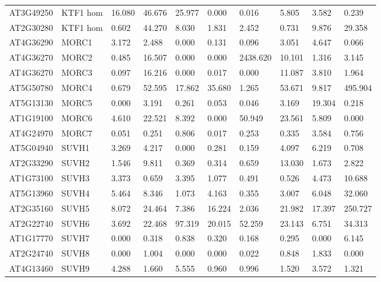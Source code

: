 \begin{landscape}
\begin{longtable}{l|l|lll|ll|lll}
AT3G49250 & KTF1 hom & 16.080 & 46.676  & 25.977   & 0.000  & 0.016    & 5.805   & 3.582  & 0.239    \\
AT2G30280 & KTF1 hom & 0.602  & 44.270  & 8.030    & 1.831  & 2.452    & 0.731   & 9.876  & 29.358   \\ \hline
AT4G36290 & MORC1    & 3.172  & 2.488   & 0.000    & 0.131  & 0.096    & 3.051   & 4.647  & 0.066    \\
AT4G36270 & MORC2    & 0.485  & 16.507  & 0.000    & 0.000  & 2438.620 & 10.101  & 1.316  & 3.145    \\
AT4G36270 & MORC3    & 0.097  & 16.216  & 0.000    & 0.017  & 0.000    & 11.087  & 3.810  & 1.964    \\
AT5G50780 & MORC4    & 0.679  & 52.595  & 17.862   & 35.680 & 1.265    & 53.671  & 9.817  & 495.904  \\
AT5G13130 & MORC5    & 0.000  & 3.191   & 0.261    & 0.053  & 0.046    & 3.169   & 19.304 & 0.218    \\
AT1G19100 & MORC6    & 4.610  & 22.521  & 8.392    & 0.000  & 50.949   & 23.561  & 5.809  & 0.000    \\
AT4G24970 & MORC7    & 0.051  & 0.251   & 0.806    & 0.017  & 0.253    & 0.335   & 3.584  & 0.756    \\ \hline
AT5G04940 & SUVH1    & 3.269  & 4.217   & 0.000    & 0.281  & 0.159    & 4.097   & 6.219  & 0.708    \\
AT2G33290 & SUVH2    & 1.546  & 9.811   & 0.369    & 0.314  & 0.659    & 13.030  & 1.673  & 2.822    \\
AT1G73100 & SUVH3    & 3.373  & 0.659   & 3.395    & 1.077  & 0.491    & 0.526   & 4.473  & 10.688   \\
AT5G13960 & SUVH4    & 5.464  & 8.346   & 1.073    & 4.163  & 0.355    & 3.007   & 6.048  & 32.060   \\
AT2G35160 & SUVH5    & 8.072  & 24.464  & 7.386    & 16.224 & 2.036    & 21.982  & 17.397 & 250.727  \\
AT2G22740 & SUVH6    & 3.692  & 22.468  & 97.319   & 20.015 & 52.259   & 23.143  & 6.751  & 34.313   \\
AT1G17770 & SUVH7    & 0.000  & 0.318   & 0.838    & 0.320  & 0.168    & 0.295   & 0.000  & 6.145    \\
AT2G24740 & SUVH8    & 0.000  & 1.004   & 0.000    & 0.000  & 0.022    & 0.848   & 1.833  & 0.000    \\
AT4G13460 & SUVH9    & 4.288  & 1.660   & 5.555    & 0.960  & 0.996    & 1.520   & 3.572  & 1.321    \\

\end{longtable}
\end{landscape}
